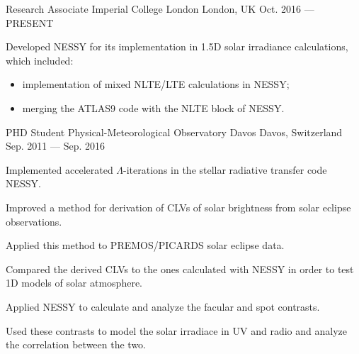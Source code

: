 

\begin{cventries}

  \cventry
    {Research Associate} %
    {Imperial College London} %
    {London, UK} %
    {Oct. 2016 --- PRESENT} %
    {
      \begin{cvitems} %
        \item {Developed NESSY for its implementation in 1.5D solar irradiance calculations, which included:}
            \begin{itemize}
                \item {implementation of mixed NLTE/LTE calculations in NESSY;}
                \item {merging the ATLAS9 code with the NLTE block of NESSY.}
            \end{itemize}
      \end{cvitems}
    }

  \cventry
    {PHD Student} %
    {Physical-Meteorological Observatory Davos} %
    {Davos, Switzerland} %
    {Sep. 2011 --- Sep. 2016} %
    {
      \begin{cvitems} %
        \item {Implemented accelerated $\Lambda$-iterations in the stellar radiative transfer code NESSY.}
        \item {Improved a method for derivation of CLVs of solar brightness from solar eclipse observations.}
        \item {Applied this method to PREMOS/PICARDS solar eclipse data.}
        \item {Compared the derived CLVs to the ones calculated with NESSY in order to test 1D models of solar atmosphere.}
        \item {Applied NESSY to calculate and analyze the facular and spot contrasts.}
        \item {Used these contrasts to model the solar irradiace in UV and radio and analyze the correlation between the two.}
      \end{cvitems}
    }


\end{cventries}
